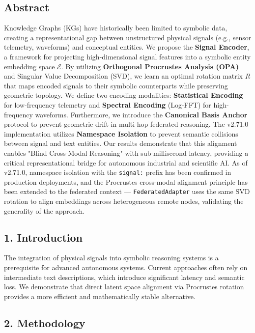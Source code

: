 
\subsection*{Abstract}
Knowledge Graphs (KGs) have historically been limited to symbolic data, creating a representational gap between unstructured physical signals (e.g., sensor telemetry, waveforms) and conceptual entities. We propose the \textbf{Signal Encoder}, a framework for projecting high-dimensional signal features into a symbolic entity embedding space $\mathcal{E}$. By utilizing \textbf{Orthogonal Procrustes Analysis (OPA)} \cite{schonemann1966procrustes, gower2004procrustes} and Singular Value Decomposition (SVD), we learn an optimal rotation matrix $R$ that maps encoded signals to their symbolic counterparts while preserving geometric topology. We define two encoding modalities: \textbf{Statistical Encoding} for low-frequency telemetry and \textbf{Spectral Encoding} (Log-FFT) for high-frequency waveforms. Furthermore, we introduce the \textbf{Canonical Basis Anchor} protocol to prevent geometric drift in multi-hop federated reasoning. The v2.71.0 implementation utilizes \textbf{Namespace Isolation} to prevent semantic collisions between signal and text entities. Our results demonstrate that this alignment enables "Blind Cross-Modal Reasoning" with sub-millisecond latency, providing a critical representational bridge for autonomous industrial and scientific AI. As of v2.71.0, namespace isolation with the \texttt{signal:} prefix has been confirmed in production deployments, and the Procrustes cross-modal alignment principle has been extended to the federated context --- \texttt{FederatedAdapter} uses the same SVD rotation to align embeddings across heterogeneous remote nodes, validating the generality of the approach.

\subsection*{1. Introduction}
The integration of physical signals into symbolic reasoning systems is a prerequisite for advanced autonomous systems. Current approaches often rely on intermediate text descriptions, which introduce significant latency and semantic loss. We demonstrate that direct latent space alignment via Procrustes rotation provides a more efficient and mathematically stable alternative.

\subsection*{2. Methodology}

